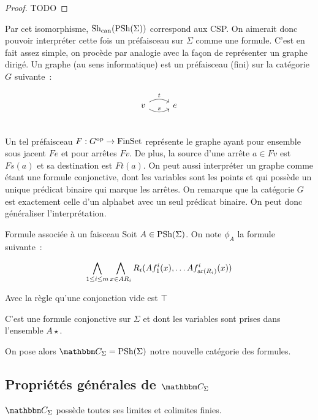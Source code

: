 \begin{proof}
    TODO
\end{proof}

Par cet isomorphisme, $\text{Sh}_\text{can}(\text{PSh}(\Sigma))$ correspond aux CSP. On aimerait donc pouvoir
interpréter cette fois un préfaisceau sur $\Sigma$ comme une formule. C'est en fait assez
simple, on procède par analogie avec la façon de représenter un graphe dirigé. Un graphe
(au sens informatique) est un préfaisceau (fini) sur la catégorie $G$ suivante~:

\[\begin{tikzcd}
    v \arrow[r, bend right, "s"] \arrow[r, bend left, "t"] & e \\
\end{tikzcd}\]

Un tel préfaisceau $F : G^{\text{op}}\rightarrow\text{FinSet}$ représente le graphe ayant pour
ensemble sous jacent $Fe$ et pour arrêtes $Fv$. De plus, la source d'une arrête $a\in Fv$
est $Fs(a)$ et sa destination est $Ft(a)$. On peut aussi interpréter un graphe comme
étant une formule conjonctive, dont les variables sont les points et qui possède un
unique prédicat binaire qui marque les arrêtes. On remarque que la catégorie $G$ est
exactement celle d'un alphabet avec un seul prédicat binaire. On peut donc généraliser
l'interprétation.

\begin{defi}{Formule associée à un faisceau}
    Soit $A\in\text{PSh}(\Sigma)$. On note $\phi_A$ la formule suivante~:
    
    \[\bigwedge_{1\leq i\leq m} \bigwedge_{x\in AR_i}
            R_i(Af_1^i(x), \dots Af_{\text{ar}(R_i)}^i(x)) \]

    Avec la règle qu'une conjonction vide est $\top$

    C'est une formule conjonctive sur $\Sigma$ et dont les variables sont prises dans
    l'ensemble $A\star$.
\end{defi}

On pose alors $\C_\Sigma = \psh(\Sigma)$ notre nouvelle catégorie des formules.

\subsection{Propriétés générales de $\C_\Sigma$}

\begin{lem}
    $\C_\Sigma$ possède toutes ses limites et colimites finies.
\end{lem}

